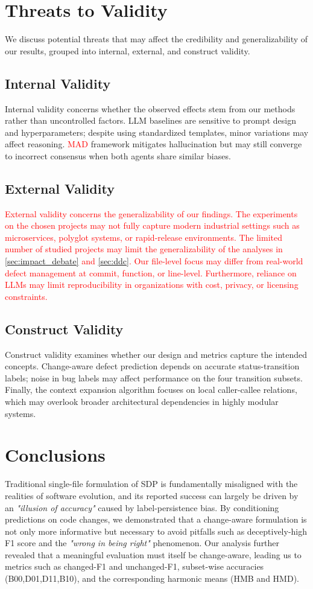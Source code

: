 \documentclass[authoryear,final,5p,times,twocolumn]{elsarticle}
\theoremstyle{plain}
\begin{document}
\section{Threats to Validity}
\label{sec:validity}
We discuss potential threats that may affect the credibility and generalizability of our results, grouped into internal, external, and construct validity.
\subsection{Internal Validity}
Internal validity concerns whether the observed effects stem from our methods rather than uncontrolled factors.  
LLM baselines are sensitive to prompt design and hyperparameters; despite using standardized templates, minor variations may affect reasoning. \textcolor{red}{MAD} framework mitigates hallucination but may still converge to incorrect consensus when both agents share similar biases.
\subsection{External Validity}
\textcolor{red}{External validity concerns the generalizability of our findings. The experiments on the chosen projects may not fully capture modern industrial settings such as microservices, polyglot systems, or rapid-release environments. The limited number of studied projects may limit the generalizability of the analyses in \autoref{sec:impact_debate} and \autoref{sec:ddc}. Our file-level focus may differ from real-world defect management at commit, function, or line-level. Furthermore, reliance on LLMs may limit reproducibility in organizations with cost, privacy, or licensing constraints.}
\subsection{Construct Validity}
Construct validity examines whether our design and metrics capture the intended concepts. Change-aware defect prediction depends on accurate status-transition labels; noise in bug labels may affect performance on the four transition subsets.
Finally, the context expansion algorithm focuses on local caller-callee relations, which may overlook broader architectural dependencies in highly modular systems.
\section{Conclusions}
\label{sec:conclusion}
Traditional single-file formulation of SDP is fundamentally misaligned with the realities of software evolution, and its reported success can largely be driven by an \emph{"illusion of accuracy"} caused by label-persistence bias. By conditioning predictions on code changes, we demonstrated that a change-aware formulation is not only more informative but necessary to avoid pitfalls such as deceptively-high F1 score and the \emph{"wrong in being right"} phenomenon. Our analysis further revealed that a meaningful evaluation must itself be change-aware, leading us to metrics such as changed-F1 and unchanged-F1, subset-wise accuracies (B00,D01,D11,B10), and the corresponding harmonic means (HMB and HMD). 
\end{document}
